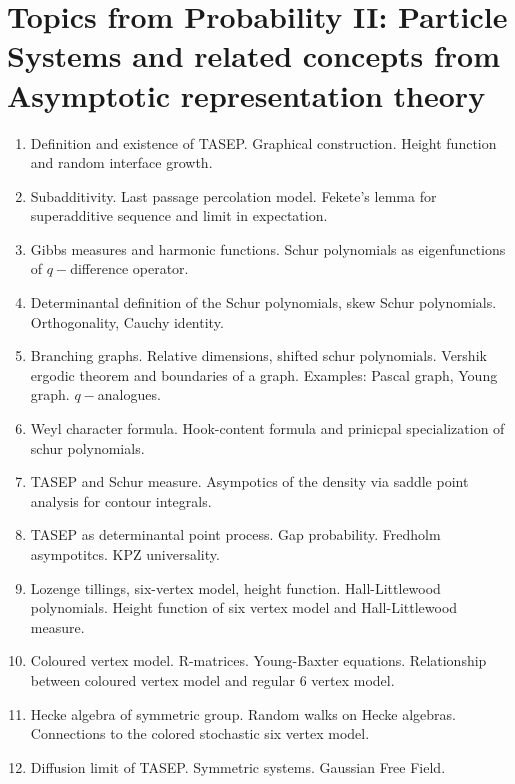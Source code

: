 \documentclass{article}
\begin{document}
\section*{Topics from Probability II: Particle Systems and related concepts from Asymptotic representation theory}
\begin{enumerate}
    \item Definition and existence of TASEP. Graphical construction. Height function and random interface growth. 
    \item Subadditivity. Last passage percolation model. Fekete's lemma for superadditive sequence and limit in expectation. 
    \item Gibbs measures and harmonic functions. Schur polynomials as eigenfunctions of $q-$difference operator.
    \item Determinantal definition of the Schur polynomials, skew Schur polynomials. Orthogonality, Cauchy identity.
    \item Branching graphs. Relative dimensions, shifted schur polynomials. Vershik ergodic theorem and boundaries of a graph.  Examples: Pascal graph, Young graph. $q-$analogues.
    \item Weyl character formula. Hook-content formula and prinicpal specialization of schur polynomials.
    \item TASEP and Schur measure. Asympotics of the density via saddle point analysis for contour integrals.
    \item TASEP as determinantal point process. Gap probability. Fredholm asympotitcs. KPZ universality.
    \item Lozenge tillings, six-vertex model, height function. Hall-Littlewood polynomials. Height function of six vertex model and Hall-Littlewood measure.
    \item Coloured vertex model. R-matrices. Young-Baxter equations. Relationship between coloured vertex model and regular 6 vertex model.
    \item Hecke algebra of symmetric group. Random walks on Hecke algebras. Connections to the colored stochastic six vertex model.
    \item Diffusion limit of TASEP. Symmetric systems. Gaussian Free Field.
\end{enumerate}



\nocite{*}
\end{document}

